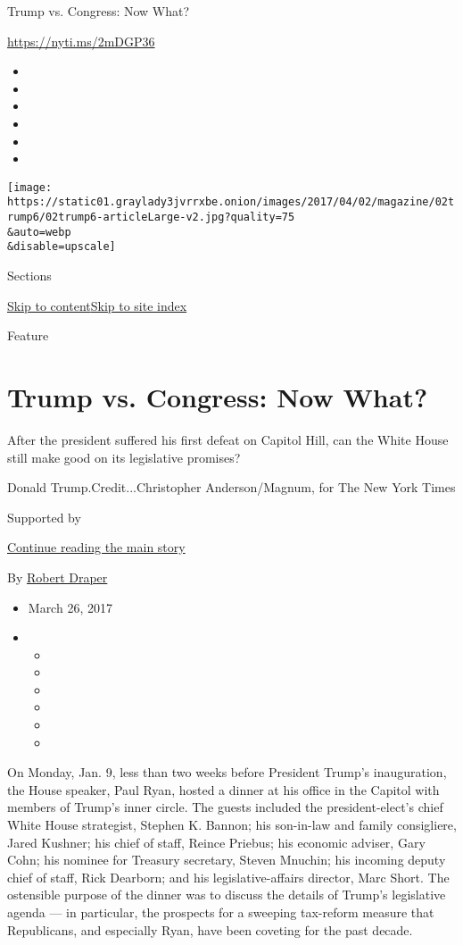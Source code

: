 Trump vs. Congress: Now What?

\url{https://nyti.ms/2mDGP36}

\begin{itemize}
\item
\item
\item
\item
\item
\item
\end{itemize}

\texttt{[image: https://static01.graylady3jvrrxbe.onion/images/2017/04/02/magazine/02trump6/02trump6-articleLarge-v2.jpg?quality=75\\\&auto=webp\\\&disable=upscale]}

Sections

\protect\hyperlink{site-content}{Skip to
content}\protect\hyperlink{site-index}{Skip to site index}

Feature

\hypertarget{trump-vs-congress-now-what}{%
\section{Trump vs. Congress: Now
What?}\label{trump-vs-congress-now-what}}

After the president suffered his first defeat on Capitol Hill, can the
White House still make good on its legislative promises?

Donald Trump.Credit...Christopher Anderson/Magnum, for The New York
Times

Supported by

\protect\hyperlink{after-sponsor}{Continue reading the main story}

By \href{http://www.nytimes3xbfgragh.onion/by/robert-draper}{Robert
Draper}

\begin{itemize}
\item
  March 26, 2017
\item
  \begin{itemize}
  \item
  \item
  \item
  \item
  \item
  \item
  \end{itemize}
\end{itemize}

On Monday, Jan. 9, less than two weeks before President Trump's
inauguration, the House speaker, Paul Ryan, hosted a dinner at his
office in the Capitol with members of Trump's inner circle. The guests
included the president-elect's chief White House strategist, Stephen K.
Bannon; his son-in-law and family consigliere, Jared Kushner; his chief
of staff, Reince Priebus; his economic adviser, Gary Cohn; his nominee
for Treasury secretary, Steven Mnuchin; his incoming deputy chief of
staff, Rick Dearborn; and his legislative-affairs director, Marc Short.
The ostensible purpose of the dinner was to discuss the details of
Trump's legislative agenda --- in particular, the prospects for a
sweeping tax-reform measure that Republicans, and especially Ryan, have
been coveting for the past decade.

